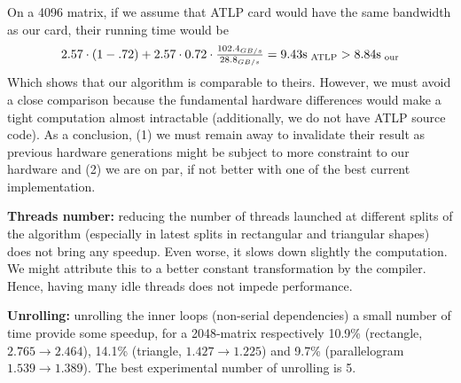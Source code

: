 \item On a 4096 matrix, if we assume that ATLP card would have the same bandwidth as our card, their running time would be
\[2.57 \cdot (1-.72) + 2.57 \cdot 0.72 \cdot \tfrac{102.4_{GB/s}}{28.8_{GB/s}} = 9.43\rm s_{\text{ ATLP}} > 8.84\rm s_{\text{ our}}\]
Which shows that our algorithm is comparable to theirs. However, we must avoid a close comparison because the fundamental hardware differences would make a tight computation almost intractable (additionally, we do not have ATLP source code).
\ule
As a conclusion, (1) we must remain away to invalidate their result as previous hardware generations might be subject to more constraint to our hardware and (2) we are on par, if not better with one of the best current implementation.

\item \textbf{Threads number:} reducing the number of threads launched at different splits of the algorithm (especially in latest splits in rectangular and triangular shapes) does not bring any speedup. Even worse, it slows down slightly the computation. We might attribute this to a better constant transformation by the compiler. Hence, having many idle threads does not impede performance.

\item \textbf{Unrolling:} unrolling the inner loops (non-serial dependencies) a small number of time provide some speedup, for a 2048-matrix respectively 10.9\% (rectangle, $2.765\to 2.464$), 14.1\% (triangle, $1.427\to 1.225$) and 9.7\% (parallelogram $1.539\to 1.389$). The best experimental number of unrolling is 5.
\ule

